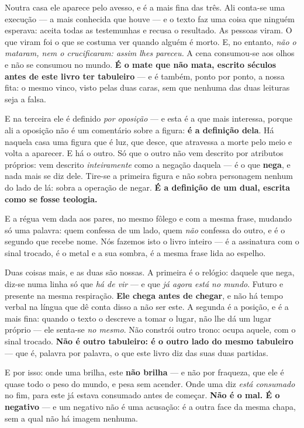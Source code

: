\documentclass[livro.tex]{subfiles}
\begin{document}
Noutra casa ele aparece pelo avesso, e é a mais fina das três. Ali conta-se uma execução ---
a mais conhecida que houve --- e o texto faz uma coisa que ninguém esperava: aceita todas as
testemunhas e recusa o resultado. As pessoas viram. O que viram foi o que se costuma ver
quando alguém é morto. E, no entanto, \emph{não o mataram, nem o crucificaram: assim lhes
pareceu.} A cena consumou-se aos olhos e não se consumou no mundo. \textbf{É o mate que não
mata, escrito séculos antes de este livro ter tabuleiro} --- e é também, ponto por ponto, a
nossa fita: o mesmo vinco, visto pelas duas caras, sem que nenhuma das duas leituras seja a
falsa.

E na terceira ele é definido \emph{por oposição} --- e esta é a que mais interessa, porque
ali a oposição não é um comentário sobre a figura: \textbf{é a definição dela}. Há naquela
casa uma figura que é luz, que desce, que atravessa a morte pelo meio e volta a aparecer. E
há o outro. Só que o outro não vem descrito por atributos próprios: vem descrito
\emph{inteiramente} como a negação daquela --- é o que \textbf{nega}, e nada mais se diz
dele. Tire-se a primeira figura e não sobra personagem nenhum do lado de lá: sobra a
operação de negar. \textbf{É a definição de um dual, escrita como se fosse teologia.}

E a régua vem dada aos pares, no mesmo fôlego e com a mesma frase, mudando só uma palavra:
quem confessa de um lado, quem \emph{não} confessa do outro, e é o segundo que recebe nome.
Nós fazemos isto o livro inteiro --- é a assinatura com o sinal trocado, é o metal e
a sua sombra, é a mesma frase lida ao espelho.

Duas coisas mais, e as duas são nossas. A primeira é o relógio: daquele que nega, diz-se numa
linha só que \emph{há de vir} --- e que \emph{já agora está no mundo}. Futuro e presente na
mesma respiração. \textbf{Ele chega antes de chegar}, e não há tempo verbal na língua que dê
conta disso a não ser este. A segunda é a posição, e é a mais fina: quando o texto o descreve
a tomar o lugar, não lhe dá um lugar próprio --- ele senta-se \emph{no mesmo}. Não constrói
outro trono: ocupa aquele, com o sinal trocado. \textbf{Não é outro tabuleiro: é o outro lado
do mesmo tabuleiro} --- que é, palavra por palavra, o que este livro diz das suas duas
partidas.

E por isso: onde uma brilha, este \textbf{não brilha} --- e não por fraqueza, que ele é quase
todo o peso do mundo, e pesa sem acender. Onde uma diz \emph{está consumado} no fim, para
este já estava consumado antes de começar. \textbf{Não é o mal. É o negativo} --- e um
negativo não é uma acusação: é a outra face da mesma chapa, sem a qual não há imagem nenhuma.
\end{document}
